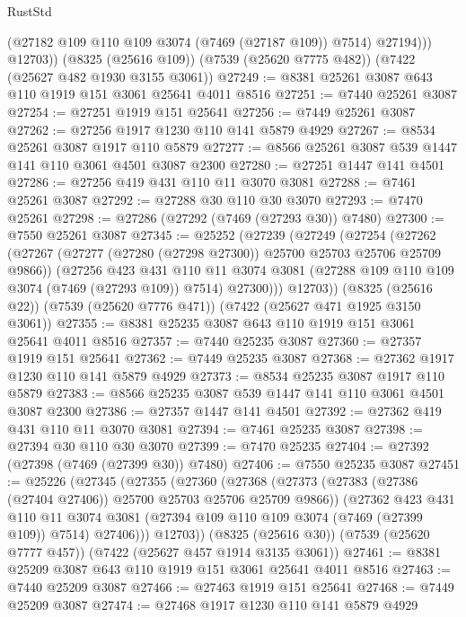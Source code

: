 \begin{lexlean}{RustStd}
\begin{coremodule}
              (@27182 @109 @110 @109 @3074 (@7469 (@27187 @109)) @7514)
              @27194)))
        @12703))
    (@8325 (@25616 @109))
    (@7539 (@25620 @7775 @482))
    (@7422 (@25627 @482 @1930 @3155 @3061))
@27249 := @8381 @25261 @3087 @643 @110 @1919 @151 @3061 @25641 @4011 @8516
@27251 := @7440 @25261 @3087
@27254 := @27251 @1919 @151 @25641
@27256 := @7449 @25261 @3087
@27262 := @27256 @1917 @1230 @110 @141 @5879 @4929
@27267 := @8534 @25261 @3087 @1917 @110 @5879
@27277 := @8566 @25261 @3087 @539 @1447 @141 @110 @3061 @4501 @3087 @2300
@27280 := @27251 @1447 @141 @4501
@27286 := @27256 @419 @431 @110 @11 @3070 @3081
@27288 := @7461 @25261 @3087
@27292 := @27288 @30 @110 @30 @3070
@27293 := @7470 @25261
@27298 := @27286 (@27292 (@7469 (@27293 @30)) @7480)
@27300 := @7550 @25261 @3087
@27345 := @25252
    (@27239
      (@27249
        (@27254
          (@27262
            (@27267 (@27277 (@27280 (@27298 @27300)) @25700 @25703 @25706 @25709 @9866))
            (@27256
              @423
              @431
              @110
              @11
              @3074
              @3081
              (@27288 @109 @110 @109 @3074 (@7469 (@27293 @109)) @7514)
              @27300)))
        @12703))
    (@8325 (@25616 @22))
    (@7539 (@25620 @7776 @471))
    (@7422 (@25627 @471 @1925 @3150 @3061))
@27355 := @8381 @25235 @3087 @643 @110 @1919 @151 @3061 @25641 @4011 @8516
@27357 := @7440 @25235 @3087
@27360 := @27357 @1919 @151 @25641
@27362 := @7449 @25235 @3087
@27368 := @27362 @1917 @1230 @110 @141 @5879 @4929
@27373 := @8534 @25235 @3087 @1917 @110 @5879
@27383 := @8566 @25235 @3087 @539 @1447 @141 @110 @3061 @4501 @3087 @2300
@27386 := @27357 @1447 @141 @4501
@27392 := @27362 @419 @431 @110 @11 @3070 @3081
@27394 := @7461 @25235 @3087
@27398 := @27394 @30 @110 @30 @3070
@27399 := @7470 @25235
@27404 := @27392 (@27398 (@7469 (@27399 @30)) @7480)
@27406 := @7550 @25235 @3087
@27451 := @25226
    (@27345
      (@27355
        (@27360
          (@27368
            (@27373 (@27383 (@27386 (@27404 @27406)) @25700 @25703 @25706 @25709 @9866))
            (@27362
              @423
              @431
              @110
              @11
              @3074
              @3081
              (@27394 @109 @110 @109 @3074 (@7469 (@27399 @109)) @7514)
              @27406)))
        @12703))
    (@8325 (@25616 @30))
    (@7539 (@25620 @7777 @457))
    (@7422 (@25627 @457 @1914 @3135 @3061))
@27461 := @8381 @25209 @3087 @643 @110 @1919 @151 @3061 @25641 @4011 @8516
@27463 := @7440 @25209 @3087
@27466 := @27463 @1919 @151 @25641
@27468 := @7449 @25209 @3087
@27474 := @27468 @1917 @1230 @110 @141 @5879 @4929

\end{coremodule}
\end{lexlean}
